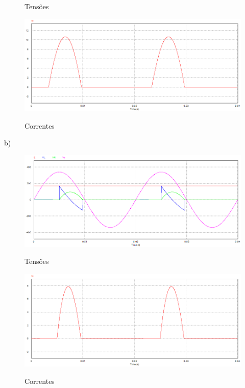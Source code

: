 \documentclass[titlepage, a4paper, 11pt, reqno, openany]{report}
\begin{document}
\begin{enumerate}
\begin{figure}[H]
\caption{Tens\~{o}es}
\label{grafico 19}
\end{figure}\par
%
\begin{figure}[H]
\centering
\includegraphics[width=0.90\linewidth]{./image/P2A2p3a_2.png}\\
\caption{Correntes}
\label{grafico 20}
\end{figure}\par
%
b)\par
%
\begin{figure}[H]
\centering
\includegraphics[width=0.90\linewidth]{./image/P2A2p3b_1.png}\\
\caption{Tens\~{o}es}
\label{grafico 21}
\end{figure}\par
%
\begin{figure}[H]
\centering
\includegraphics[width=0.90\linewidth]{./image/P2A2p3b_2.png}\\
\caption{Correntes}
\label{grafico 22}
\end{figure}\par

\end{enumerate}
\end{document}
